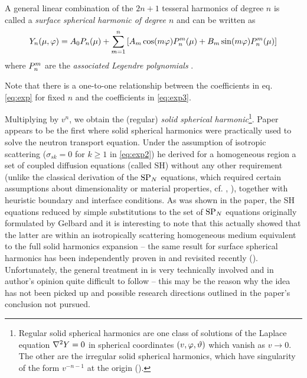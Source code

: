 \begin{definition}\label{defn:SSH}
  A general linear combination of the $2n + 1$ tesseral harmonics of degree $n$ is called a \textit{surface spherical 
  harmonic of degree $n$} and can be written as
  \begin{equation}\label{eq:exp3}
    Y_n(\mu,\azimuthal) = A_0 P_n(\mu) + \suma[m]{1}{n}\left[ A_m \cos(m\azimuthal)\P{n}{m}(\mu) + B_m \sin(m\azimuthal)\P{n}{m}(\mu)\right]
  \end{equation}
  where $\P{n}{m}$ are the \textit{associated Legendre polynomials} \cite[Chap. VI]{Byerly}. 
\end{definition}
Note that there is a one-to-one relationship between the coefficients in eq. \eqref{eq:exp} for fixed $n$ and the 
coefficients in \eqref{eq:exp3}.

Multiplying by $v^n$, we obtain the (regular) \textit{solid spherical harmonic}\footnote{Regular solid spherical
harmonics are one class of solutions of the Laplace equation $\lap Y = 0$ in spherical coordinates
$(v,\azimuthal,\polar)$ which vanish as $v\to 0$. The other are the irregular solid spherical harmonics, which have
singularity of the form $v^{-n-1}$ at the origin (\cite[Chap. VI]{Byerly}).}. Paper \cite{Ackroyd1} appears to be the
first where solid spherical harmonics were practically used to solve the neutron transport equation. Under the
assumption of isotropic scattering ($\sigma_{sk} = 0$ for $k \geq 1$ in \eqref{eq:exp2}) he derived for a homogeneous
region a set of coupled diffusion equations (called SH\PN) without any other requirement (unlike the classical
derivation of the $\SPN$ equations, which required certain assumptions about dimensionality or material properties, cf.
\cite{Larsen1}, \cite{Pomraning1}), together with heuristic boundary and interface conditions. As was shown in the
paper, the SH\PN~ equations reduced by simple substitutions to the set of $\SPN$ equations originally formulated by
Gelbard and it is interesting to note that this actually showed that the latter are within an isotropically scattering
homogeneous medium equivalent to the full solid harmonics expansion -- the same result for surface spherical harmonics
has been independently proven in \cite{Coppa1} and revisited recently (\cite{Coppa2,McClarren1}). Unfortunately, the
general treatment in \cite{Ackroyd1} is very technically involved and in author's opinion quite difficult to follow --
this may be the reason why the idea has not been picked up and possible research directions outlined in the paper's
conclusion not pursued.

